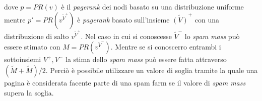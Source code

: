 dove \(p=PR(v)\) è il \textit{pagerank} dei nodi basato su una distribuzione uniforme mentre \(p'=PR(v^{\tilde{V}^+})\) è \textit{pagerank} basato sull'insieme \(\tilde{(V)}^+\)  con una distribuzione di salto \(v^{\tilde{V}^+}\). Nel caso in cui si conoscesse \(\tilde{V}^-\) lo \textit{spam mass} può essere stimato con \(M=PR(v^{\tilde{V}^-})\). Mentre se si conoscerro entrambi i sottoinsiemi \(V^+, V^-\) la stima dello \textit{spam mass} può essere fatta attraverso \((\tilde{M}+\tilde{M})/2\). Perciò è possibile utilizzare un valore di soglia tramite la quale una pagina è considerata facente parte di una spam farm se il valore di \textit{spam mass} supera la soglia.

